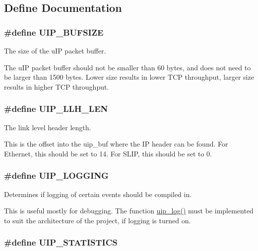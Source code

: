 \subsection{Define Documentation}
\hypertarget{a00076_g3589822ecb9d9c4145209756396b8a6b}{
\subsubsection[UIP\_\-BUFSIZE]{\setlength{\rightskip}{0pt plus 5cm}\#define UIP\_\-BUFSIZE}}
\label{a00076_g3589822ecb9d9c4145209756396b8a6b}


The size of the u\-IP packet buffer. 

The u\-IP packet buffer should not be smaller than 60 bytes, and does not need to be larger than 1500 bytes. Lower size results in lower TCP throughput, larger size results in higher TCP throughput. \hypertarget{a00076_ge6f4a2453dbd8bc60e6a82774552366a}{
\subsubsection[UIP\_\-LLH\_\-LEN]{\setlength{\rightskip}{0pt plus 5cm}\#define UIP\_\-LLH\_\-LEN}}
\label{a00076_ge6f4a2453dbd8bc60e6a82774552366a}


The link level header length. 

This is the offset into the uip\_\-buf where the IP header can be found. For Ethernet, this should be set to 14. For SLIP, this should be set to 0. \hypertarget{a00076_g21664b7441cfa37d280228d23316d609}{
\subsubsection[UIP\_\-LOGGING]{\setlength{\rightskip}{0pt plus 5cm}\#define UIP\_\-LOGGING}}
\label{a00076_g21664b7441cfa37d280228d23316d609}


Determines if logging of certain events should be compiled in. 

This is useful mostly for debugging. The function \hyperlink{a00076_gb58e1ceb7cb73ca2bcd73146b6c1b4e7}{uip\_\-log()} must be implemented to suit the architecture of the project, if logging is turned on. \hypertarget{a00076_g5726142fec34f35fb9ea19e5a45975c6}{
\subsubsection[UIP\_\-STATISTICS]{\setlength{\rightskip}{0pt plus 5cm}\#define UIP\_\-STATISTICS}}
\label{a00076_g5726142fec34f35fb9ea19e5a45975c6}


